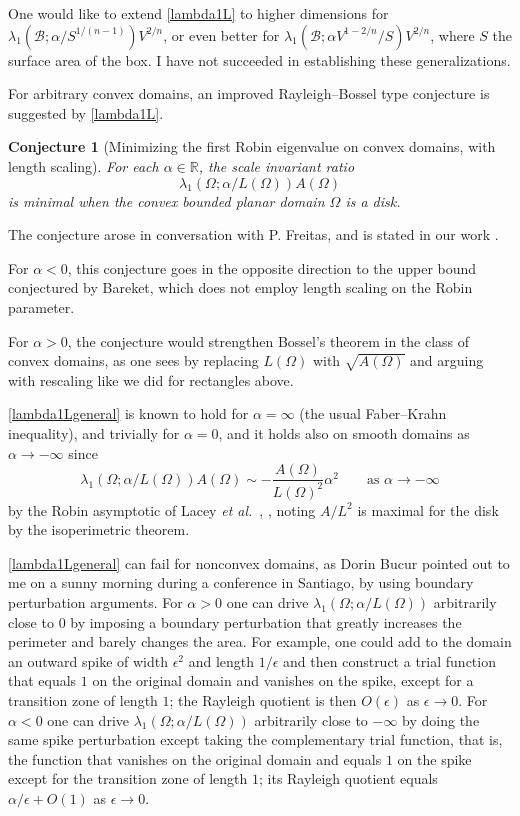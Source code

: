 \documentclass[12pt,reqno]{amsart}
\newtheorem{conjx}{Conjecture}
\theoremstyle{definition}
\newcommand{\R}{{\mathbb R}}
\begin{document}
One would like to extend \autoref{lambda1L} to higher dimensions for $\lambda_1(\mathcal{B};\alpha/S^{1/(n-1)})V^{2/n}$, or even better for $\lambda_1(\mathcal{B};\alpha V^{1-2/n}/S)V^{2/n}$, where $S$ the surface area of the box. I have not succeeded in establishing these generalizations.  

For arbitrary convex domains, an improved Rayleigh--Bossel type conjecture is suggested by \autoref{lambda1L}.  
%
\begin{conjx}[Minimizing the first Robin eigenvalue on convex domains, with length scaling] \label{lambda1Lgeneral}
For each $\alpha \in \R$, the scale invariant ratio
\[
    \lambda_1(\Omega;\alpha/L(\Omega)) A(\Omega)
\]
is minimal when the convex bounded planar domain $\Omega$ is a disk. 
\end{conjx}
%
The conjecture arose in conversation with P. Freitas, and is stated in our work \cite{FL18b}.

For $\alpha<0$, this conjecture goes in the opposite direction to the upper bound conjectured by Bareket, which does not employ length scaling on the Robin parameter. 

For $\alpha>0$, the conjecture would strengthen Bossel's theorem in the class of convex domains, as one sees by replacing $L(\Omega)$ with $\sqrt{A(\Omega)}$ and arguing with rescaling like we did for rectangles above. 

\autoref{lambda1Lgeneral} is known to hold for $\alpha=\infty$ (the usual Faber--Krahn inequality), and trivially for $\alpha=0$, and it holds also on smooth domains as $\alpha \to -\infty$  since 
%
\begin{equation} \label{Robinasymptotic}
\lambda_1(\Omega;\alpha/L(\Omega)) A(\Omega) \sim - \frac{A(\Omega)}{L(\Omega)^2} \alpha^2 \qquad \text{as $\alpha \to -\infty$}
\end{equation}
%
by the Robin asymptotic of Lacey \emph{et al.}\ \cite[Theorem 4.14]{H17}, \cite{LOS98}, noting $A/L^2$ is maximal for the disk by the isoperimetric theorem. 

\autoref{lambda1Lgeneral} can fail for nonconvex domains, as Dorin Bucur pointed out to me on a sunny morning during a conference in Santiago, by using boundary perturbation arguments. For $\alpha>0$ one can drive $\lambda_1(\Omega;\alpha/L(\Omega))$ arbitrarily close to $0$ by imposing a boundary perturbation that greatly increases the perimeter and barely changes the area. For example, one could add to the domain an outward spike of width $\epsilon^2$ and length $1/\epsilon$ and then construct a trial function that equals $1$ on the original domain and vanishes on the spike, except for a transition zone of length $1$; the Rayleigh quotient is then $O(\epsilon)$ as $\epsilon \to 0$. For $\alpha<0$ one can drive $\lambda_1(\Omega;\alpha/L(\Omega))$ arbitrarily close to $-\infty$ by doing the same spike perturbation except taking the complementary trial function, that is, the function that vanishes on the original domain and equals $1$ on the spike except for the transition zone of length $1$; its Rayleigh quotient equals $\alpha/\epsilon+O(1)$ as $\epsilon \to 0$.  
\end{document}
